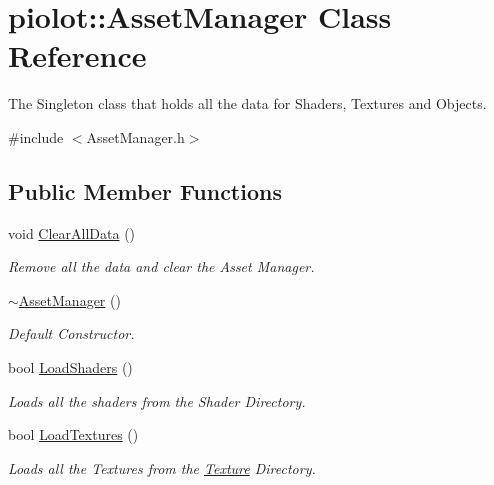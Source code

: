 \hypertarget{classpiolot_1_1_asset_manager}{}\section{piolot\+:\+:Asset\+Manager Class Reference}
\label{classpiolot_1_1_asset_manager}


The Singleton class that holds all the data for Shaders, Textures and Objects.  




{\ttfamily \#include $<$Asset\+Manager.\+h$>$}

\subsection*{Public Member Functions}
\begin{DoxyCompactItemize}
\item 
void \mbox{\hyperlink{classpiolot_1_1_asset_manager_ab6e938de7632862bfbe0a673b6c53b21}{Clear\+All\+Data}} ()
\begin{DoxyCompactList}\small\item\em Remove all the data and clear the Asset Manager. \end{DoxyCompactList}\item 
\mbox{\hyperlink{classpiolot_1_1_asset_manager_a49967e4909436ff8ebaeadf08db4ebc7}{$\sim$\+Asset\+Manager}} ()
\begin{DoxyCompactList}\small\item\em Default Constructor. \end{DoxyCompactList}\item 
\mbox{\label{classpiolot_1_1_asset_manager_ac56fdedc1bf3b98909856099811fa62f}} 
bool \mbox{\hyperlink{classpiolot_1_1_asset_manager_ac56fdedc1bf3b98909856099811fa62f}{Load\+Shaders}} ()
\begin{DoxyCompactList}\small\item\em Loads all the shaders from the Shader Directory. \end{DoxyCompactList}\item 
\mbox{\label{classpiolot_1_1_asset_manager_a34593c7f84f33abd929daa8510507881}} 
bool \mbox{\hyperlink{classpiolot_1_1_asset_manager_a34593c7f84f33abd929daa8510507881}{Load\+Textures}} ()
\begin{DoxyCompactList}\small\item\em Loads all the Textures from the \mbox{\hyperlink{classpiolot_1_1_texture}{Texture}} Directory. \end{DoxyCompactList}\item 

\end{DoxyCompactItemize}
